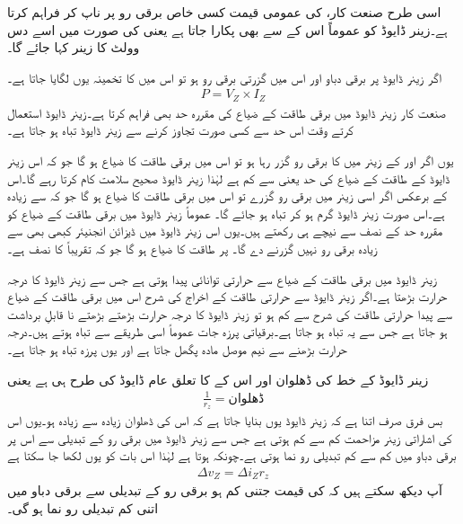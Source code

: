 اسی طرح صنعت کار،   کی عمومی قیمت کسی خاص برقی رو  پر ناپ کر فراہم کرتا ہے۔زینر ڈایوڈ کو عموماً اس کے  سے بھی پکارا جاتا ہے یعنی  کی صورت میں اسے دس وولٹ کا زینر کہا جائے گا۔

اگر زینر ڈایوڈ پر برقی دباو  اور اس میں گزرتی برقی رو  ہو تو اس میں    کا تخمینہ یوں لگایا جاتا ہے۔
\begin{align}
P=V_Z \times I_Z
\end{align}
صنعت کار زینر ڈایوڈ میں برقی طاقت کے ضیاع کی مقررہ حد بھی فراہم کرتا ہے۔زینر ڈایوڈ استعمال کرتے وقت اس حد سے کسی صورت تجاوز کرنے سے زینر ڈایوڈ تباہ ہو جاتا ہے۔

یوں اگر  اور  کے زینر میں   کا برقی رو گزر رہا ہو تو اس میں برقی طاقت کا ضیاع  ہو گا جو کہ اس زینر ڈایوڈ کے طاقت کے ضیاع کی حد یعنی  سے کم ہے لہٰذا زینر ڈایوڈ صحیح سلامت کام کرتا رہے گا۔اس کے برعکس اگر اسی زینر میں  برقی رو گزرے تو اس میں برقی طاقت کا ضیاع  ہو گا جو کہ  سے زیادہ ہے۔اس صورت زینر ڈایوڈ گرم ہو کر تباہ ہو جائے گا۔  عموماً زینر ڈایوڈ میں برقی طاقت کے ضیاع کو مقررہ حد کے نصف سے نیچے ہی رکھتے ہیں۔یوں اس زینر ڈایوڈ میں ڈیزائن انجنیئر کبھی بھی   سے زیادہ برقی رو نہیں گزرنے دے گا۔  پر طاقت کا ضیاع  ہو گا جو کہ تقریباً   کا نصف ہے۔

زینر ڈایوڈ میں برقی طاقت کے ضیاع سے حرارتی توانائی پیدا ہوتی ہے جس سے زینر ڈایوڈ کا درجہ حرارت بڑھتا ہے۔اگر زینر ڈایوڈ سے حرارتی طاقت کے اخراج کی شرح اس میں برقی طاقت کے ضیاع سے پیدا حرارتی طاقت کی شرح سے کم ہو تو زینر ڈایوڈ کا درجہ حرارت بڑھتے بڑھتے نا قابلِ برداشت ہو جاتا ہے جس سے یہ تباہ ہو جاتا ہے۔برقیاتی پرزہ جات عموماً اسی طریقے سے تباہ ہوتے ہیں۔درجہ حرارت بڑھنے سے نیم موصل مادہ پگھل جاتا ہے اور یوں پرزہ تباہ ہو جاتا ہے۔ 

زینر ڈایوڈ کے خط کی ڈھلوان اور اس کے    کا تعلق عام ڈایوڈ کی طرح ہی ہے یعنی
\begin{align}
\frac{1}{r_z}=\text{ڈھلوان}
\end{align}
بس فرق صرف اتنا ہے کہ زینر ڈایوڈ یوں بنایا جاتا ہے کہ اس کی ڈھلوان زیادہ سے زیادہ ہو۔یوں اس کی اشاراتی زینر مزاحمت کم سے کم ہوتی ہے جس سے زینر ڈایوڈ میں برقی رو کے تبدیلی سے اس پر برقی دباو میں کم سے کم تبدیلی رو نما ہوتی ہے۔چونکہ   ہوتا ہے لہٰذا اس بات کو یوں لکھا جا سکتا ہے
\begin{align}
\Delta v_Z = \Delta i_Z r_z
\end{align}
آپ دیکھ سکتے ہیں کہ   کی قیمت جتنی کم ہو برقی رو کے تبدیلی سے برقی دباو میں اتنی کم تبدیلی رو نما ہو گی۔

